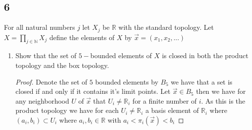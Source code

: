 \documentclass{amsart}
\theoremstyle{plain}
\theoremstyle{definition}
\theoremstyle{remark}
\begin{document}
\subsection*{6} 
For all natural numbers $j$ let $X_j$ be $\mathbb{R}$ with the standard topology. Let $X=\prod_{j\in \mathbb{N}}X_j$ define the elements of $X$ by $\vec x=(x_1,x_2,...)$

\begin{enumerate}
    \item Show that the set of $5-$bounded elements of $X$ is closed in both the product topology and the box topology.
    \begin{proof}
        Denote the set of $5$ bounded elements by $B_5$ we have that a set is closed if and only if it contains it's limit points. Let $\vec{x}\in B_5$ then we have for any neighborhood $U$ of $\vec{x}$ that $U_i\not=  \mathbb R_i$ for a finite number of $i$. As this is the product topology we have for each $U_i\not = \mathbb{R}_i$  a basis element of $\mathbb{R}_i$ where $(a_i,b_i)\subset U_i $ where $a_i,b_i\in \mathbb{R}$ with $a_i<\pi_i(\vec{x})<b_i$
    \end{proof}
\end{enumerate}
\end{document}

